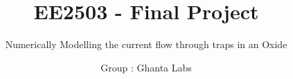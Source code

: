 \documentclass{tudelft-report}
\begin{document}
\frontmatter

\title{EE2503 - Final Project}
\subtitle{Numerically Modelling the current flow through traps in an Oxide}
\author{Group : Ghanta Labs}

\subject{EE2503: NMDM} %






\tableofcontents




\mainmatter
 











% 
% 
\end{document}
